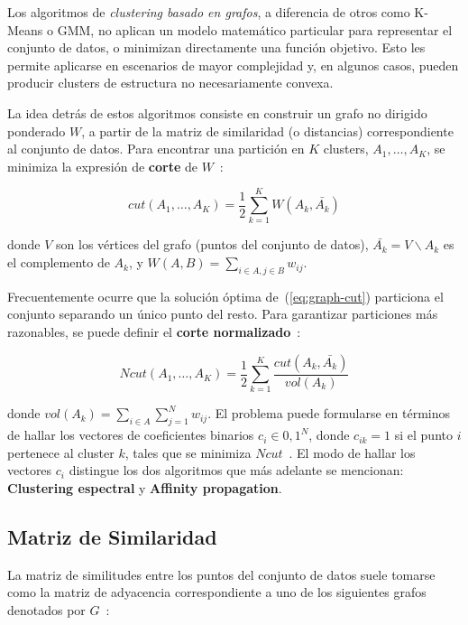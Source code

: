 Los algoritmos de \textit{clustering basado en grafos}, a diferencia de otros como K-Means o GMM, no aplican un modelo matemático particular para representar el conjunto de datos, o minimizan directamente una función objetivo.
Esto les permite aplicarse en escenarios de mayor complejidad y, en algunos casos, pueden producir clusters de estructura no necesariamente convexa.

La idea detrás de estos algoritmos consiste en construir un grafo no dirigido ponderado $W$, a partir de la matriz de similaridad (o distancias) correspondiente al conjunto de datos.
Para encontrar una partición en $K$ clusters, $A_1,\dots,A_K$, se minimiza la expresión de \textbf{corte} de $W$~\cite{Murphy12}:

\begin{equation}
    \label{eq:graph-cut}
    cut(A_1,\dots,A_K) = \frac{1}{2}\sum_{k=1}^{K}{W(A_k,\bar{A_k})}
\end{equation}

\noindent
donde $V$ son los vértices del grafo (puntos del conjunto de datos), $\bar{A_k}=V\backslash A_k$ es el complemento de $A_k$, y $W(A,B) = \sum_{i\in A, j \in B}{w_{ij}}$.

Frecuentemente ocurre que la solución óptima de~(\ref{eq:graph-cut}) particiona el conjunto separando un único punto del resto.
Para garantizar particiones más razonables, se puede definir el \textbf{corte normalizado}~\cite{Murphy12}:

\begin{equation}
    \label{eq:normalized-cut}
    Ncut(A_1,\dots,A_K) = \frac{1}{2}\sum_{k=1}^{K}{\frac{cut(A_k,\bar{A_k})}{vol(A_k)}}
\end{equation}

\noindent
donde $vol(A_k)=\sum_{i\in A}\sum_{j=1}^{N}{w_{ij}}$.
El problema puede formularse en términos de hallar los vectores de coeficientes binarios $c_i\in{0,1}^N$, donde $c_{ik} = 1$ si el punto $i$ pertenece al cluster $k$, tales que se minimiza $Ncut$~\cite{Murphy12}.
El modo de hallar los vectores $c_i$ distingue los dos algoritmos que más adelante se mencionan: \textbf{Clustering espectral} y \textbf{Affinity propagation}.

\subsection{Matriz de Similaridad}\label{subsec:matrizDeSimilaridad}

La matriz de similitudes entre los puntos del conjunto de datos suele tomarse como la matriz de adyacencia correspondiente a uno de los siguientes grafos denotados por $G$~\cite{Luxburg07,Aggarawal13}:

